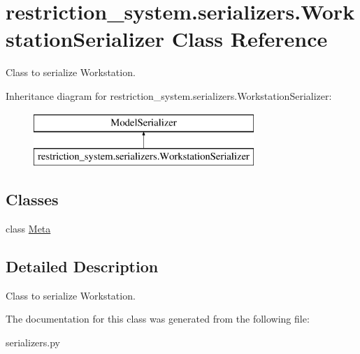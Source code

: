 \hypertarget{classrestriction__system_1_1serializers_1_1WorkstationSerializer}{}\section{restriction\+\_\+system.\+serializers.\+Workstation\+Serializer Class Reference}
\label{classrestriction__system_1_1serializers_1_1WorkstationSerializer}


Class to serialize Workstation.  


Inheritance diagram for restriction\+\_\+system.\+serializers.\+Workstation\+Serializer\+:\begin{figure}[H]
\begin{center}
\leavevmode
\includegraphics[height=2.000000cm]{classrestriction__system_1_1serializers_1_1WorkstationSerializer}
\end{center}
\end{figure}
\subsection*{Classes}
\begin{DoxyCompactItemize}
\item 
class \hyperlink{classrestriction__system_1_1serializers_1_1WorkstationSerializer_1_1Meta}{Meta}
\end{DoxyCompactItemize}


\subsection{Detailed Description}
Class to serialize Workstation. 

The documentation for this class was generated from the following file\+:\begin{DoxyCompactItemize}
\item 
serializers.\+py\end{DoxyCompactItemize}
